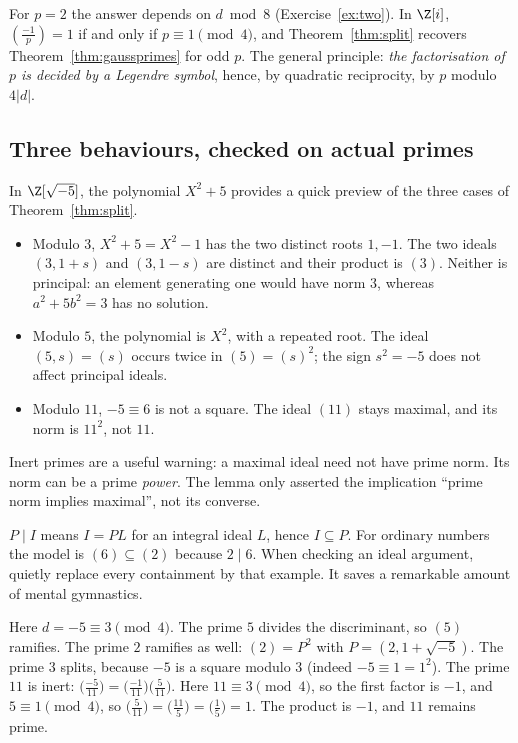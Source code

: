 For $p=2$ the answer depends on $d\bmod8$ (Exercise~\ref{ex:two}). In $\Z[i]$, $\left(\frac{-1}p\right)=1$ if and only if $p\equiv1\pmod4$, and Theorem~\ref{thm:split} recovers Theorem~\ref{thm:gaussprimes} for odd $p$. The general principle: \emph{the factorisation of $p$ is decided by a Legendre symbol}, hence, by quadratic reciprocity, by $p$ modulo $4|d|$.

\subsection*{Three behaviours, checked on actual primes}
In $\Z[\sqrt{-5}]$, the polynomial $X^2+5$ provides a quick preview of the
three cases of Theorem~\ref{thm:split}.
\begin{itemize}
\item Modulo $3$, $X^2+5=X^2-1$ has the two distinct roots $1,-1$.
The two ideals $(3,1+s)$ and $(3,1-s)$ are distinct and their product is $(3)$.
Neither is principal: an element generating one would have norm $3$, whereas
$a^2+5b^2=3$ has no solution.
\item Modulo $5$, the polynomial is $X^2$, with a repeated root. The ideal
$(5,s)=(s)$ occurs twice in $(5)=(s)^2$; the sign $s^2=-5$ does not affect
principal ideals.
\item Modulo $11$, $-5\equiv6$ is not a square. The ideal $(11)$ stays maximal,
and its norm is $11^2$, not $11$.
\end{itemize}
Inert primes are a useful warning: a maximal ideal need not have prime norm.
Its norm can be a prime \emph{power}. The lemma only asserted the implication
``prime norm implies maximal'', not its converse.

\begin{reminder}
$P\mid I$ means $I=PL$ for an integral ideal $L$, hence $I\subseteq P$.
For ordinary numbers the model is $(6)\subseteq(2)$ because $2\mid6$.
When checking an ideal argument, quietly replace every containment by that
example. It saves a remarkable amount of mental gymnastics.
\end{reminder}

\begin{examplex}
Here $d=-5\equiv 3\pmod 4$. The prime $5$ divides the discriminant, so $(5)$ ramifies. The prime $2$ ramifies as well: $(2)=P^2$ with $P=(2,1+\sqrt{-5})$. The prime $3$ splits, because $-5$ is a square modulo $3$ (indeed $-5\equiv 1=1^2$). The prime $11$ is inert: $\bigl(\frac{-5}{11}\bigr)=\bigl(\frac{-1}{11}\bigr)\bigl(\frac{5}{11}\bigr)$. Here $11\equiv 3\pmod 4$, so the first factor is $-1$, and $5\equiv 1\pmod 4$, so $\bigl(\frac{5}{11}\bigr)=\bigl(\frac{11}{5}\bigr)=\bigl(\frac{1}{5}\bigr)=1$. The product is $-1$, and $11$ remains prime.
\end{examplex}

